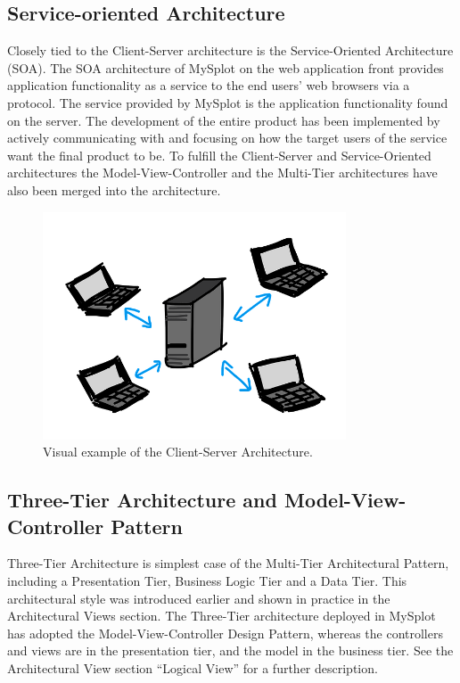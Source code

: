\subsection{Service-oriented Architecture}
Closely tied to the Client-Server architecture is the Service-Oriented Architecture (SOA). The SOA architecture of MySplot on the web application front provides application functionality as a service to the end users' web browsers via a protocol. The service provided by MySplot is the application functionality found on the server. The development of the entire product has been implemented by actively communicating with and focusing on how the target users of the service want the final product to be. To fulfill the Client-Server and Service-Oriented architectures the Model-View-Controller and the Multi-Tier architectures have also been merged into the architecture.

\begin{figure}
\centering
\includegraphics[width=90mm]{./Architecture/img/clientserver2.png}
\caption{Visual example of the Client-Server Architecture. \label{overflow}}
\end{figure}

\subsection{Three-Tier Architecture and Model-View-Controller Pattern} Three-Tier Architecture is simplest case of the Multi-Tier Architectural Pattern, including a Presentation Tier, Business Logic Tier and a Data Tier. This architectural style was introduced earlier and shown in practice in the Architectural Views section. The Three-Tier architecture deployed in MySplot has adopted the Model-View-Controller Design Pattern, whereas the controllers and views are in the presentation tier, and the model in the business tier. See the Architectural View section ``Logical View'' for a further description.

